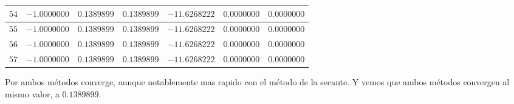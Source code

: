 \begin{center}
\begin{longtable}{|c|c|c|c|c|c|c|}
		$54$ & $-1.0000000$ & $0.1389899$ & $0.1389899$ & $-11.6268222$ & $0.0000000$ & $0.0000000$ \\ \hline
		$55$ & $-1.0000000$ & $0.1389899$ & $0.1389899$ & $-11.6268222$ & $0.0000000$ & $0.0000000$ \\ \hline
		$56$ & $-1.0000000$ & $0.1389899$ & $0.1389899$ & $-11.6268222$ & $0.0000000$ & $0.0000000$ \\ \hline
		$57$ & $-1.0000000$ & $0.1389899$ & $0.1389899$ & $-11.6268222$ & $0.0000000$ & $0.0000000$ \\ \hline
	\end{longtable}
\end{center}


Por ambos métodos converge, aunque notablemente mas rapido con el método de la secante. Y vemos que ambos métodos convergen al mismo
valor, a $0.1389899$.